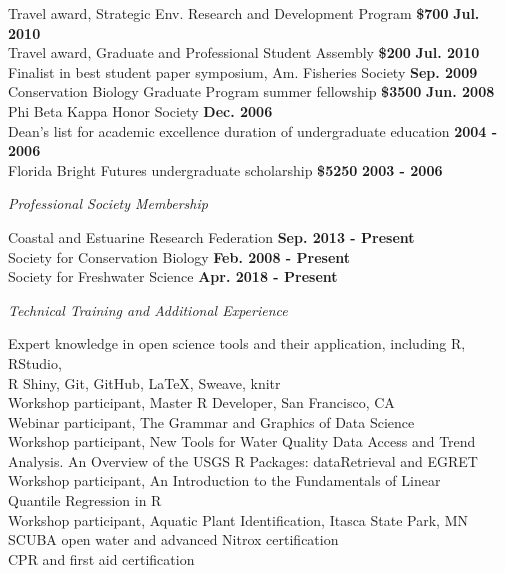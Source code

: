 \documentclass[letterpaper,12pt]{article}
\newcommand{\sectitle}[1]{\vspace{\baselineskip} \centerline{\large{\textit{#1}}}}
\begin{document}
Travel award, Strategic Env. Research and Development Program {\bf \$700} \hfill {\bf Jul. 2010} \\
Travel award, Graduate and Professional Student Assembly {\bf \$200} \hfill {\bf Jul. 2010} \\
Finalist in best student paper symposium, Am. Fisheries Society \hfill {\bf Sep. 2009} \\
Conservation Biology Graduate Program summer fellowship {\bf \$3500} \hfill {\bf Jun. 2008} \\
Phi Beta Kappa Honor Society \hfill {\bf Dec. 2006} \\
Dean's list for academic excellence duration of undergraduate education \hfill {\bf 2004 - 2006} \\
Florida Bright Futures undergraduate scholarship {\bf \$5250} \hfill {\bf 2003 - 2006} 

\sectitle{Professional Society Membership}

Coastal and Estuarine Research Federation \hfill {\bf Sep. 2013 - Present} \\
Society for Conservation Biology \hfill {\bf Feb. 2008 - Present} \\
Society for Freshwater Science \hfill {\bf Apr. 2018 - Present}

\sectitle{Technical Training and Additional Experience}

Expert knowledge in open science tools and their application, including R, RStudio, \\
\hspace{0.3in}R Shiny, Git, GitHub, \LaTeX, Sweave, knitr \\
Workshop participant, Master R Developer, San Francisco, CA \\
Webinar participant, The Grammar and Graphics of Data Science \\
Workshop participant, New Tools for Water Quality Data Access and Trend \\ \hspace{0.3in} Analysis. An Overview of the USGS R Packages: dataRetrieval and EGRET\\
Workshop participant, An Introduction to the Fundamentals of Linear \\
\hspace{0.3in}Quantile Regression in R \\
Workshop participant, Aquatic Plant Identification, Itasca State Park, MN \\
SCUBA open water and advanced Nitrox certification \\
CPR and first aid certification
\end{document}
